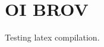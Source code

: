 \documentclass{article}
\begin{document}
\section{OI BROV}
Testing latex compilation.


\end{document}
